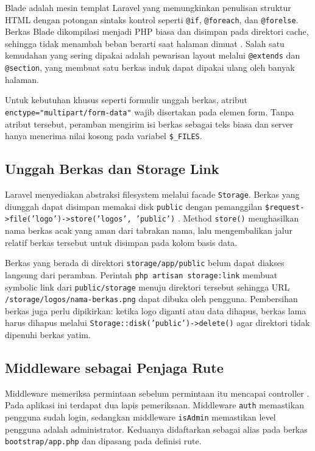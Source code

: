 \documentclass[12pt,a4paper]{article}
\begin{document}
Blade adalah mesin templat Laravel yang memungkinkan penulisan struktur HTML dengan potongan sintaks kontrol seperti \texttt{@if}, \texttt{@foreach}, dan \texttt{@forelse}. Berkas Blade dikompilasi menjadi PHP biasa dan disimpan pada direktori cache, sehingga tidak menambah beban berarti saat halaman dimuat \cite{laravel2026blade}. Salah satu kemudahan yang sering dipakai adalah pewarisan layout melalui \texttt{@extends} dan \texttt{@section}, yang membuat satu berkas induk dapat dipakai ulang oleh banyak halaman.

Untuk kebutuhan khusus seperti formulir unggah berkas, atribut \texttt{enctype="multipart/form-data"} wajib disertakan pada elemen form. Tanpa atribut tersebut, peramban mengirim isi berkas sebagai teks biasa dan server hanya menerima nilai kosong pada variabel \texttt{\$\_FILES}.

\subsection{Unggah Berkas dan Storage Link}

Laravel menyediakan abstraksi filesystem melalui facade \texttt{Storage}. Berkas yang diunggah dapat disimpan memakai disk \texttt{public} dengan pemanggilan \texttt{\$request->file('logo')->store('logos', 'public')} \cite{laravel2026filesystem}. Method \texttt{store()} menghasilkan nama berkas acak yang aman dari tabrakan nama, lalu mengembalikan jalur relatif berkas tersebut untuk disimpan pada kolom basis data.

Berkas yang berada di direktori \texttt{storage/app/public} belum dapat diakses langsung dari peramban. Perintah \texttt{php artisan storage:link} membuat symbolic link dari \texttt{public/storage} menuju direktori tersebut sehingga URL \texttt{/storage/logos/nama-berkas.png} dapat dibuka oleh pengguna. Pembersihan berkas juga perlu dipikirkan: ketika logo diganti atau data dihapus, berkas lama harus dihapus melalui \texttt{Storage::disk('public')->delete()} agar direktori tidak dipenuhi berkas yatim.

\subsection{Middleware sebagai Penjaga Rute}

Middleware memeriksa permintaan sebelum permintaan itu mencapai controller \cite{laravel2026middleware}. Pada aplikasi ini terdapat dua lapis pemeriksaan. Middleware \texttt{auth} memastikan pengguna sudah login, sedangkan middleware \texttt{isAdmin} memastikan level pengguna adalah administrator. Keduanya didaftarkan sebagai alias pada berkas \texttt{bootstrap/app.php} dan dipasang pada definisi rute.
\end{document}
